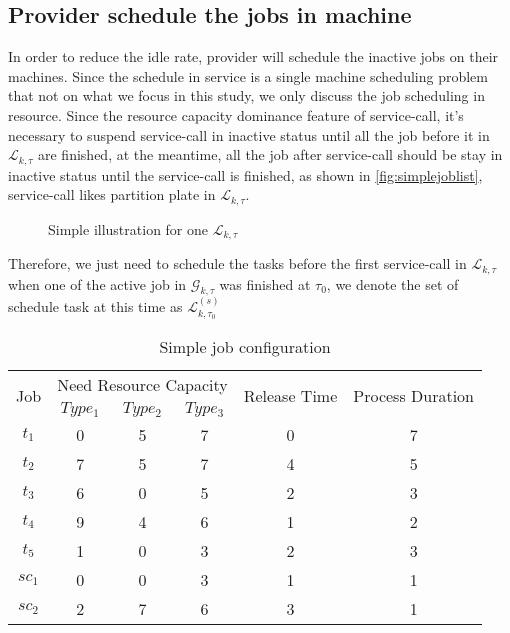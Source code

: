 

\subsection{Provider schedule the jobs in machine} %
\label{sub:schedule_the_jobs_in_machine}
In order to reduce the idle rate, provider will schedule the inactive jobs on their machines. Since the schedule in service is a single machine scheduling problem that not on  what we focus in this study, we only discuss the job scheduling in resource. Since the  resource capacity dominance feature of service-call, it's necessary to suspend service-call in inactive status until all the job before it in $\mathcal{L}_{k,\tau}$ are finished, at the meantime, all the job after service-call should be stay in inactive status until the service-call is finished, as shown in \autoref{fig:simplejoblist}, service-call likes partition plate in $\mathcal{L}_{k,\tau}$.
\begin{figure}[htbp]
	\centering
	\resizebox{.7\textwidth}{!}{}
	\caption{Simple illustration for one $\mathcal{L}_{k,\tau}$}
	\label{fig:simplejoblist}
\end{figure}
Therefore, we just need to schedule the tasks before the first service-call in $\mathcal{L}_{k,\tau}$ when one of the active job in $\mathcal{G}_{k,\tau}$ was finished at $\tau_0$, we denote the set of schedule task at this time as $\mathcal{L}^{(s)}_{k,\tau_0}$

\begin{table}[htbp]
  \centering
  \scriptsize
  \caption{Simple job configuration}
    \begin{tabular}{cccccc}
    \toprule
    \multicolumn{1}{c}{\multirow{2}[0]{*}{ Job}} & \multicolumn{3}{c}{Need Resource Capacity} & \multicolumn{1}{c}{\multirow{2}[0]{*}{Release Time}} & \multicolumn{1}{c}{\multirow{2}[0]{*}{Process Duration}} \\
    \multicolumn{1}{c}{} & $Type_1$ & $Type_2$ & $Type_3$ & \multicolumn{1}{c}{} & \multicolumn{1}{c}{} \\
    \midrule
    $t_1$ & 0     & 5     & 7     & 0     & 7 \\
    $t_2$ & 7     & 5     & 7     & 4     & 5 \\
    $t_3$ & 6     & 0     & 5     & 2     & 3 \\
    $t_4$ & 9	 & 4  & 6 & 1 &2 \\
    $t_5$ & 1 & 0 & 3 & 2 & 3\\
    $sc_1$ & 0     & 0     & 3    & 1     & 1 \\
    $sc_2$ & 2     & 7     & 6     & 3     & 1 \\
    \bottomrule
    \end{tabular}%
  \label{tab:simplejobconfiguration}%
\end{table}%

